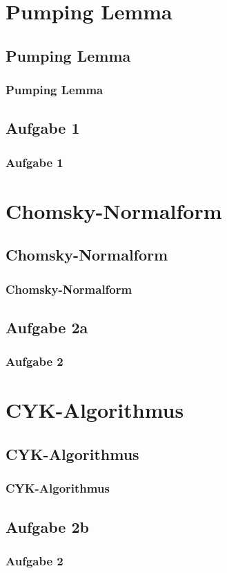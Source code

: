 


\section{Pumping Lemma}
\subsection{Pumping Lemma}
\begin{frame}
	\frametitle{Pumping Lemma}
\end{frame}

\subsection{Aufgabe 1}
\begin{frame}
	\frametitle{Aufgabe 1}
\end{frame}

\section{Chomsky-Normalform}
\subsection{Chomsky-Normalform}
\begin{frame}
	\frametitle{Chomsky-Normalform}
\end{frame}

\subsection{Aufgabe 2a}
\begin{frame}
	\frametitle{Aufgabe 2}
\end{frame}

\section{CYK-Algorithmus}
\subsection{CYK-Algorithmus}
\begin{frame}
	\frametitle{CYK-Algorithmus}
\end{frame}

\subsection{Aufgabe 2b}
\begin{frame}
	\frametitle{Aufgabe 2}
\end{frame}


